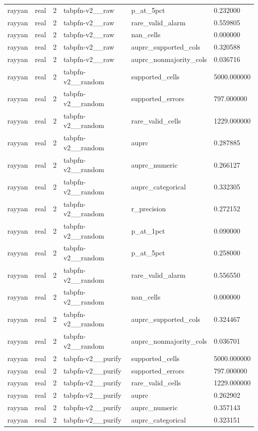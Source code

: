 \begin{tabular}{llllll}
rayyan & real & 2 & tabpfn-v2\_\_raw & p\_at\_5pct & 0.232000 \\
rayyan & real & 2 & tabpfn-v2\_\_raw & rare\_valid\_alarm & 0.559805 \\
rayyan & real & 2 & tabpfn-v2\_\_raw & nan\_cells & 0.000000 \\
rayyan & real & 2 & tabpfn-v2\_\_raw & auprc\_supported\_cols & 0.320588 \\
rayyan & real & 2 & tabpfn-v2\_\_raw & auprc\_nonmajority\_cols & 0.036716 \\
rayyan & real & 2 & tabpfn-v2\_\_random & supported\_cells & 5000.000000 \\
rayyan & real & 2 & tabpfn-v2\_\_random & supported\_errors & 797.000000 \\
rayyan & real & 2 & tabpfn-v2\_\_random & rare\_valid\_cells & 1229.000000 \\
rayyan & real & 2 & tabpfn-v2\_\_random & auprc & 0.287885 \\
rayyan & real & 2 & tabpfn-v2\_\_random & auprc\_numeric & 0.266127 \\
rayyan & real & 2 & tabpfn-v2\_\_random & auprc\_categorical & 0.332305 \\
rayyan & real & 2 & tabpfn-v2\_\_random & r\_precision & 0.272152 \\
rayyan & real & 2 & tabpfn-v2\_\_random & p\_at\_1pct & 0.090000 \\
rayyan & real & 2 & tabpfn-v2\_\_random & p\_at\_5pct & 0.258000 \\
rayyan & real & 2 & tabpfn-v2\_\_random & rare\_valid\_alarm & 0.556550 \\
rayyan & real & 2 & tabpfn-v2\_\_random & nan\_cells & 0.000000 \\
rayyan & real & 2 & tabpfn-v2\_\_random & auprc\_supported\_cols & 0.324467 \\
rayyan & real & 2 & tabpfn-v2\_\_random & auprc\_nonmajority\_cols & 0.036701 \\
rayyan & real & 2 & tabpfn-v2\_\_purify & supported\_cells & 5000.000000 \\
rayyan & real & 2 & tabpfn-v2\_\_purify & supported\_errors & 797.000000 \\
rayyan & real & 2 & tabpfn-v2\_\_purify & rare\_valid\_cells & 1229.000000 \\
rayyan & real & 2 & tabpfn-v2\_\_purify & auprc & 0.262902 \\
rayyan & real & 2 & tabpfn-v2\_\_purify & auprc\_numeric & 0.357143 \\
rayyan & real & 2 & tabpfn-v2\_\_purify & auprc\_categorical & 0.323151 \\

\end{tabular}
